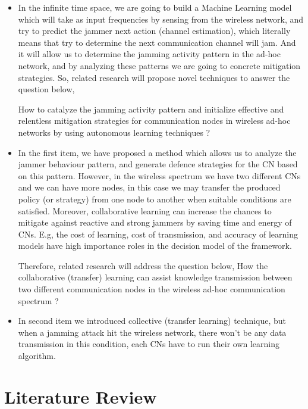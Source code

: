 \documentclass[letterpaper%
, twoside%
, 12pt%
,thesepararticles%
, english%
,creativecommons,hyperref, withAlgo2e%
]{thETS}
\begin{document}
\begin{itemize}
 \item {In the infinite time space, we are going to build a Machine Learning model which will take as input frequencies by sensing from the wireless network, and try to predict the jammer next action (channel estimation), which literally means that try to determine the next communication channel will jam. And it will allow us to determine the jamming activity pattern in the ad-hoc network, and by analyzing these patterns we are going to concrete  mitigation strategies. So, related research will propose novel techniques to answer the question below,
     
     How to catalyze the jamming activity pattern and initialize effective and relentless mitigation strategies for communication nodes in wireless ad-hoc networks by using autonomous learning techniques ?}
 \item {In the first item, we have proposed a method which allows us to analyze the jammer behaviour pattern, and generate defence strategies for the CN based on this pattern. However, in the wireless spectrum we have two different CNs and we can have more nodes, in this case we may transfer the produced policy (or strategy) from one node to another when suitable conditions are satisfied. Moreover, collaborative learning can increase the chances to mitigate against reactive and strong jammers by saving time and energy of CNs. E.g, the cost of learning, cost of transmission, and accuracy of learning models have  high importance roles in the decision model of the framework. 
  
 	Therefore, related research will address the question below, 
 	How the collaborative (transfer) learning can assist knowledge transmission between two different communication nodes in the wireless ad-hoc communication spectrum ? 
 }

 \item{In second item we introduced collective (transfer learning) technique, but when a jamming attack hit the wireless network, there won't be any data transmission in this condition, each CNs have to run their own learning algorithm. } 
 
\end{itemize}

\chapter{Literature Review}
\end{document}
